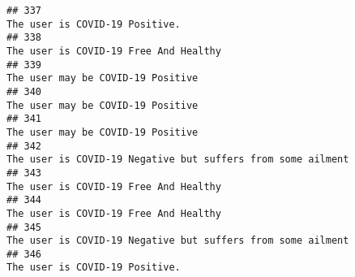\documentclass[
]{article}
\begin{document}
\begin{verbatim}
## 337                                                                                                                                                                                                                                     The user is COVID-19 Positive.
## 338                                                                                                                                                                                                                              The user is COVID-19 Free And Healthy
## 339                                                                                                                                                                                                                                  The user may be COVID-19 Positive
## 340                                                                                                                                                                                                                                  The user may be COVID-19 Positive
## 341                                                                                                                                                                                                                                  The user may be COVID-19 Positive
## 342                                                                                                                                                                                                        The user is COVID-19 Negative but suffers from some ailment
## 343                                                                                                                                                                                                                              The user is COVID-19 Free And Healthy
## 344                                                                                                                                                                                                                              The user is COVID-19 Free And Healthy
## 345                                                                                                                                                                                                        The user is COVID-19 Negative but suffers from some ailment
## 346                                                                                                                                                                                                                                     The user is COVID-19 Positive.

\end{verbatim}
\end{document}
